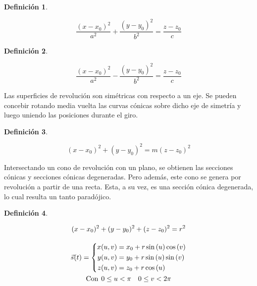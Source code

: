 \documentclass[a5paper,12pt,twoside]{book}
\newtheorem{defn}{{Definición}}[chapter]
\begin{document}
\begin{mdframed}[style=MyFrame1]
    \begin{defn}
    \end{defn}
    \begin{equation*}
        \dfrac{(x-x_0)^2}{a^2} + \dfrac{(y-y_0)^2}{b^2} = \dfrac{z-z_0}{c}
    \end{equation*}
\end{mdframed}

\begin{mdframed}[style=MyFrame1]
    \begin{defn}
    \end{defn}
    \begin{equation*}
        \dfrac{(x-x_0)^2}{a^2} - \dfrac{(y-y_0)^2}{b^2} = \dfrac{z-z_0}{c}
    \end{equation*}
\end{mdframed}


Las superficies de revolución son simétricas con respecto a un eje. Se pueden concebir rotando media vuelta las curvas cónicas sobre dicho eje de simetría y luego uniendo las posiciones durante el giro.

\begin{mdframed}[style=MyFrame1]
    \begin{defn}
    \end{defn}
    \begin{equation*}
        (x-x_0)^2 + (y-y_0)^2 = m\left(z-z_0\right)^2
    \end{equation*}
\end{mdframed}

Intersectando un cono de revolución con un plano, se obtienen las secciones cónicas y secciones cónicas degeneradas. Pero además, este cono se genera por revolución a partir de una recta. Esta, a su vez,
es una sección cónica degenerada, lo cual resulta un tanto paradójico.

\begin{mdframed}[style=MyFrame1]
    \begin{defn}
    \end{defn}
    \begin{gather*}
        (x-x_0)^2 + (y-y_0)^2 + (z-z_0)^2 = r^2
        \\[1em]
        \Vec{s}(t) = \left\{
        \begin{aligned}
            x(u,v) &= x_0 + r \sin{(u)} \cos{(v)} \\
            y(u,v) &= y_0 + r \sin{(u)} \sin{(v)} \\
            z(u,v) &= z_0 + r \cos{(u)}
        \end{aligned}
        \right.
        \\
        \textrm{Con} \hspace{1ex} 0 \leq u < \pi \quad 0 \leq v < 2 \pi
    \end{gather*}
\end{mdframed}
\end{document}
